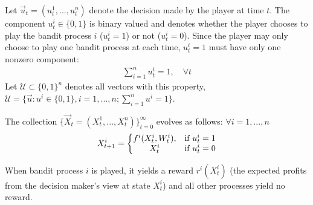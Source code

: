 \documentclass[11pt]{elegantbook}
\begin{document}
Let $\vec{u}_t=(u_t^1,...,u_t^n)$ denote the decision
made by the player at time $t$. The component $u_t^i\in\{0,1\}$ is binary valued and denotes
whether the player chooses to play the bandit
process $i$ ($u_t^i = 1$) or not ($u_t^i = 0$). Since
the player may only choose to play one bandit process at each time, $u_t^i = 1$ must have only one nonzero component:
\begin{equation}
    \begin{aligned}
        \sum_{i=1}^n u_t^i = 1,\quad \forall t
    \end{aligned}
    \nonumber
\end{equation}
Let $\mathcal{U}\subset \{0,1\}^n$ denotes all vectors with this property, $\mathcal{U}=\{\vec{u}:u^i\in\{0,1\},i=1,...,n; \sum_{i=1}^n u^i = 1\}$.

The collection $\{\vec{X}_t=(X_t^1,...,X_t^n)\}_{t=0}^\infty$ evolves as follows: $\forall i=1,...,n$
\begin{equation}
    \begin{aligned}
        X_{t+1}^i=\left\{\begin{matrix}
            f^i(X_t^i,W_t^i),&\textnormal{if }u_t^i=1\\
            X_t^i&\textnormal{if }u_t^i=0
        \end{matrix}\right.
    \end{aligned}
    \nonumber
\end{equation}

When bandit process $i$ is played, it yields a reward $r^i(X_t^i)$ (the expected profits from the decision maker's view at state $X_t^i$) and all other processes yield no reward.
\end{document}
